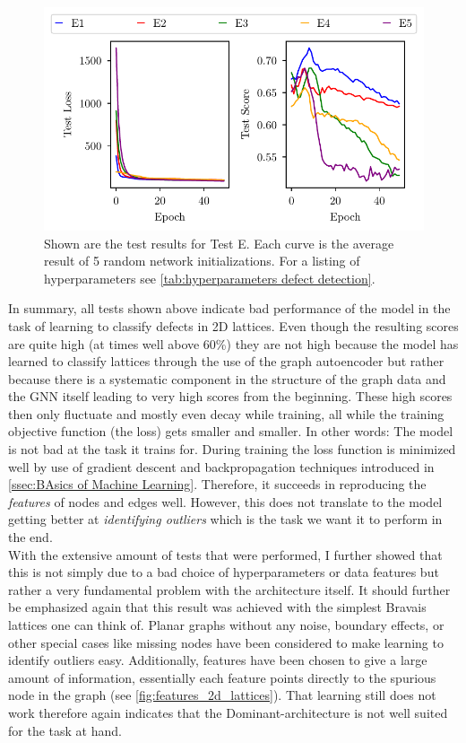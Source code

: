 \documentclass[11pt,a4paper]{article}
\begin{document}
\begin{figure}[htbp]
\centering
\includegraphics{images/plots/defect_detection_E.pdf}
\caption{Shown are the test results for Test E. Each curve is the average result of 5 random network initializations. For a listing of hyperparameters see \autoref{tab:hyperparameters defect detection}.}
\label{fig:defect detection E}
\end{figure}

In summary, all tests shown above indicate bad performance of the model in the task of learning to classify defects in 2D lattices. 
Even though the resulting scores are quite high (at times well above 60\%) they are not high because the model has learned to classify lattices through the use of the graph autoencoder but rather because there is a systematic component in the structure of the graph data and the GNN itself leading to very high scores from the beginning. 
These high scores then only fluctuate and mostly even decay while training, all while the training objective function (the loss) gets smaller and smaller. 
In other words: 
The model is not bad at the task it trains for. 
During training the loss function is minimized well by use of gradient descent and backpropagation techniques introduced in \autoref{ssec:BAsics of Machine Learning}. 
Therefore, it succeeds in reproducing the \emph{features} of nodes and edges well. 
However, this does not translate to the model getting better at \emph{identifying outliers} which is the task we want it to perform in the end. \\
With the extensive amount of tests that were performed, I further showed that this is not simply due to a bad choice of hyperparameters or data features but rather a very fundamental problem with the architecture itself. 
It should further be emphasized again that this result was achieved with the simplest Bravais lattices one can think of. 
Planar graphs without any noise, boundary effects, or other special cases like missing nodes have been considered to make learning to identify outliers easy. 
Additionally, features have been chosen to give a large amount of information, essentially each feature points directly to the spurious node in the graph (see \autoref{fig:features_2d_lattices}). 
That learning still does not work therefore again indicates that the Dominant-architecture is not well suited for the task at hand.
\end{document}
